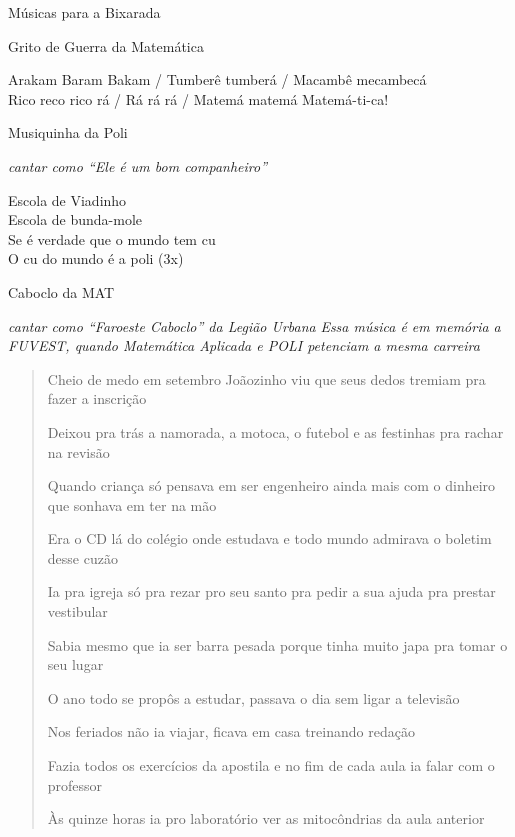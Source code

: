 \begin{secao}{Músicas para a Bixarada}



\begin{subsecao}{Grito de Guerra da Matemática}

Arakam Baram Bakam / Tumberê tumberá / Macambê mecambecá \\
Rico reco rico rá / Rá rá rá / Matemá matemá Matemá-ti-ca!
\end{subsecao}

\begin{subsecao}{Musiquinha da Poli}

{\em cantar como ``Ele é um bom companheiro''}

Escola de Viadinho \\
Escola de bunda-mole \\
Se é verdade que o mundo tem cu \\
O cu do mundo é a poli  (3x)
\end{subsecao}

\begin{subsecao}{Caboclo da MAT}

{\em cantar como ``Faroeste Caboclo'' da Legião Urbana}
{\em Essa música é em memória a FUVEST, quando Matemática Aplicada e POLI petenciam a mesma carreira}
\begin{verse}
Cheio de medo em setembro Joãozinho viu que seus dedos tremiam pra fazer a
inscrição

Deixou pra trás a namorada, a motoca, o futebol e as festinhas pra rachar na
revisão

Quando criança só pensava em ser engenheiro ainda mais com o dinheiro que
sonhava em ter na mão

Era o CD lá do colégio onde estudava e todo mundo admirava o boletim desse
cuzão

Ia pra igreja só pra rezar pro seu santo pra pedir a sua ajuda pra prestar
vestibular

Sabia mesmo que ia ser barra pesada porque tinha muito japa pra tomar o seu
lugar

O ano todo se propôs a estudar, passava o dia sem ligar a televisão

Nos feriados não ia viajar, ficava em casa treinando redação

Fazia todos os exercícios da apostila e no fim de cada aula ia falar com o
professor

Às quinze horas ia pro laboratório ver as mitocôndrias da aula anterior


\end{verse}
\end{subsecao}
\end{secao}
